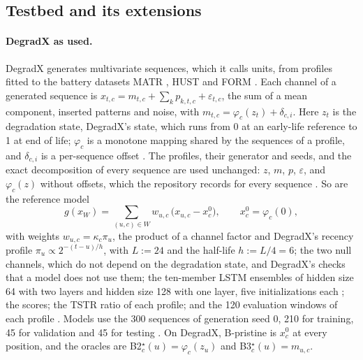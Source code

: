 \documentclass{article}
\begin{document}
\subsection{Testbed and its extensions}\label{sec:eval:testbed}

\paragraph{DegradX as used.} DegradX \citep{degradx2026} generates multivariate sequences, which it calls units, from profiles fitted to the battery datasets MATR \citep{severson2019data}, HUST \citep{ma2022real} and FORM \citep{cui2024data}. Each channel of a generated sequence is $x_{t,c} = m_{t,c}+\sum_k p_{k,t,c}+\varepsilon_{t,c}$, the sum of a mean component, inserted patterns and noise, with $m_{t,c}=\varphi_c(z_t)+\delta_{c,i}$. Here $z_t$ is the degradation state, DegradX's state, which runs from 0 at an early-life reference to 1 at end of life; $\varphi_c$ is a monotone mapping shared by the sequences of a profile, and $\delta_{c,i}$ is a per-sequence offset \citep{degradx2026}. The profiles, their generator and seeds, and the exact decomposition of every sequence are used unchanged: $z$, $m$, $p$, $\varepsilon$, and $\varphi_c(z)$ without offsets, which the repository records for every sequence \citep{degradxrepo}. So are the reference model
\begin{equation}\label{eq:refmodel}
g(x_W) = \sum_{(u,c)\in W} w_{u,c}\,\bigl(x_{u,c}-x^0_c\bigr), \qquad x^0_c = \varphi_c(0),
\end{equation}
with weights $w_{u,c}=\kappa_c\pi_u$, the product of a channel factor and DegradX's recency profile $\pi_u\propto 2^{-(t-u)/h}$, with $L:=24$ and the half-life $h:=L/4=6$; the two null channels, which do not depend on the degradation state, and DegradX's checks that a model does not use them; the ten-member LSTM ensembles of hidden size 64 with two layers and hidden size 128 with one layer, five initializations each \citep{degradxrepo}; the scores; the TSTR ratio of each profile; and the 120 evaluation windows of each profile \citep{degradx2026}. Models use the 300 sequences of generation seed 0, 210 for training, 45 for validation and 45 for testing \citep{degradx2026}. On DegradX, B-pristine is $x^0_c$ at every position, and the oracles are B2$^\star_c(u) = \varphi_c(z_u)$ and B3$^\star_c(u) = m_{u,c}$.
\end{document}
